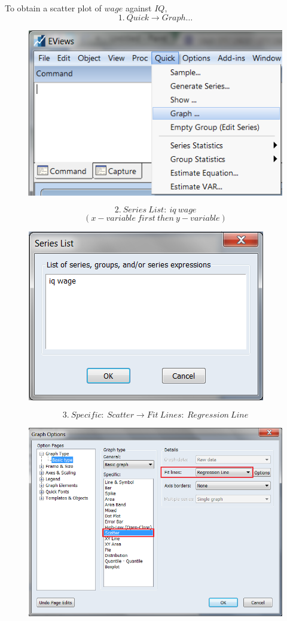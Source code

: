 \documentclass[12pt]{report}
\begin{document}
\noindent To obtain a scatter plot of $wage$ against $IQ$,
$$1.\ Quick \to Graph \dots$$
\begin{figure}[H]
	\centering
	\includegraphics{q3_7}
\end{figure}
\vspace{-\baselineskip}
$$2.\ Series\ List:\ iq\ wage$$
$$(x-variable\ first\ then\ y-variable)$$
\begin{figure}[H]
	\centering
	\includegraphics{q3_8}
\end{figure}
\vspace{-\baselineskip}
$$3.\ Specific:\ Scatter \to Fit\ Lines:\ Regression\ Line$$
\begin{figure}[H]
	\centering
	\includegraphics{q3_9}
\end{figure}
\end{document}
